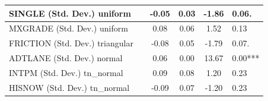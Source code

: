 \begin{table}
\begin{center}
\begin{tabular}{|l|l|c|c|c|l|}
			\hline
			SINGLE (Std. Dev.) uniform &  & -0.05 & 0.03 & -1.86 & 0.06. \\
			\hline
			MXGRADE (Std. Dev.) uniform &  & 0.08 & 0.06 & 1.52 & 0.13 \\
			\hline
			FRICTION (Std. Dev.) triangular &  & -0.08 & 0.05 & -1.79 & 0.07. \\
			\hline
			ADTLANE (Std. Dev.) normal &  & 0.06 & 0.00 & 13.67 & 0.00*** \\
			\hline
			INTPM (Std. Dev.) tn_normal &  & 0.09 & 0.08 & 1.20 & 0.23 \\
			\hline
			HISNOW (Std. Dev.) tn_normal &  & -0.09 & 0.07 & -1.20 & 0.23 \\
			\hline
		\end{tabular}
	\end{center}
\end{table}